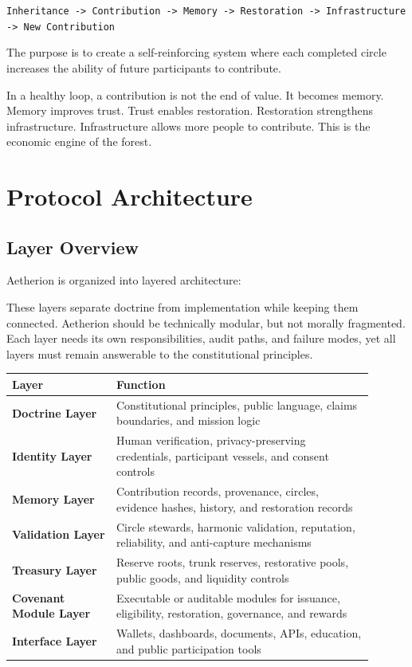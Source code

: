\documentclass[12pt]{article}
\begin{document}
\begin{center}
\texttt{Inheritance -> Contribution -> Memory -> Restoration -> Infrastructure -> New Contribution}
\end{center}

The purpose is to create a self-reinforcing system where each completed circle increases the ability of future participants to contribute.

In a healthy loop, a contribution is not the end of value. It becomes memory. Memory improves trust. Trust enables restoration. Restoration strengthens infrastructure. Infrastructure allows more people to contribute. This is the economic engine of the forest.

\aftEconomyLoopGraphic


\section{Protocol Architecture}

\subsection{Layer Overview}

Aetherion is organized into layered architecture:

These layers separate doctrine from implementation while keeping them connected. Aetherion should be technically modular, but not morally fragmented. Each layer needs its own responsibilities, audit paths, and failure modes, yet all layers must remain answerable to the constitutional principles.

\begin{longtable}{>{\bfseries}p{0.26\linewidth}p{0.64\linewidth}}
\toprule
Layer & Function \\
\midrule
Doctrine Layer & Constitutional principles, public language, claims boundaries, and mission logic \\
Identity Layer & Human verification, privacy-preserving credentials, participant vessels, and consent controls \\
Memory Layer & Contribution records, provenance, circles, evidence hashes, history, and restoration records \\
Validation Layer & Circle stewards, harmonic validation, reputation, reliability, and anti-capture mechanisms \\
Treasury Layer & Reserve roots, trunk reserves, restorative pools, public goods, and liquidity controls \\
Covenant Module Layer & Executable or auditable modules for issuance, eligibility, restoration, governance, and rewards \\
Interface Layer & Wallets, dashboards, documents, APIs, education, and public participation tools \\
\bottomrule
\end{longtable}
\end{document}
